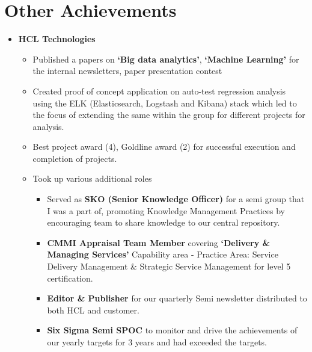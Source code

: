 \documentclass[a4paper,11pt]{article}
\begin{document}
\section*{Other Achievements}

\begin{itemize}
  \item{\bf{HCL Technologies}}
    
    \begin{itemize}
      \setlength\itemsep{-0.5em}

    \item Published a papers on \textbf{`Big data analytics'},
      \textbf{`Machine Learning'} for the internal newsletters, paper
      presentation contest

    \item Created proof of concept application on auto-test
      regression analysis using the ELK (Elasticsearch, Logstash and
      Kibana) stack which led to the focus of extending the same
      within the group for different projects for analysis.

    \item Best project award (4), Goldline award (2) for successful
      execution and completion of projects.
      
    \item Took up various additional roles
      \begin{itemize}
      \setlength\itemsep{-0.5em}
        
      \item Served as \textbf{SKO (Senior Knowledge Officer)} for a
        semi group that I was a part of, promoting Knowledge
        Management Practices by encouraging team to share knowledge to
        our central repository.

      \item \textbf{CMMI Appraisal Team Member} covering
        \textbf{`Delivery \& Managing Services'} Capability area -
        Practice Area: Service Delivery Management \& Strategic
        Service Management for level 5 certification.

      \item \textbf{Editor \& Publisher} for our quarterly Semi
        newsletter distributed to both HCL and customer.
        
      \item \textbf{Six Sigma Semi SPOC} to monitor and drive the
        achievements of our yearly targets for 3 years and had
        exceeded the targets.


\end{itemize}
\end{itemize}
\end{itemize}
\end{document}
